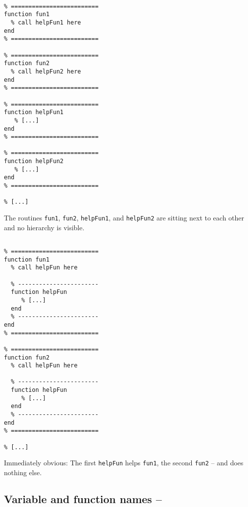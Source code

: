 \hfill
\begin{minipage}[t]{.45\textwidth}
\begin{lstlisting}[framerule=2pt,rulecolor=\color{badred}]
% [...]

% =========================
function fun1
  % call helpFun1 here
end
% =========================

% =========================
function fun2
  % call helpFun2 here
end
% =========================

% =========================
function helpFun1
   % [...]
end
% =========================

% =========================
function helpFun2
   % [...]
end
% =========================

% [...]
\end{lstlisting}
The routines \lstinline!fun1!, \lstinline!fun2!, \lstinline!helpFun1!, and \lstinline!helpFun2! are sitting next to each other and no hierarchy is visible.
\end{minipage}
\hfill
\begin{minipage}[t]{.45\textwidth}
\begin{lstlisting}[framerule=2pt,rulecolor=\color{goodgreen}]
% [...]

% =========================
function fun1
  % call helpFun here

  % -----------------------
  function helpFun
     % [...]
  end
  % -----------------------
end
% =========================

% =========================
function fun2
  % call helpFun here

  % -----------------------
  function helpFun
     % [...]
  end
  % -----------------------
end
% =========================

% [...]
\end{lstlisting}
Immediately obvious: The first \lstinline!helpFun! helps \lstinline!fun1!, the
second \lstinline!fun2! -- and does nothing else.
\end{minipage}
\hfill

%




\subsection{Variable and function names -- \cleansymbol\cleansymbol\cleansymbol}

